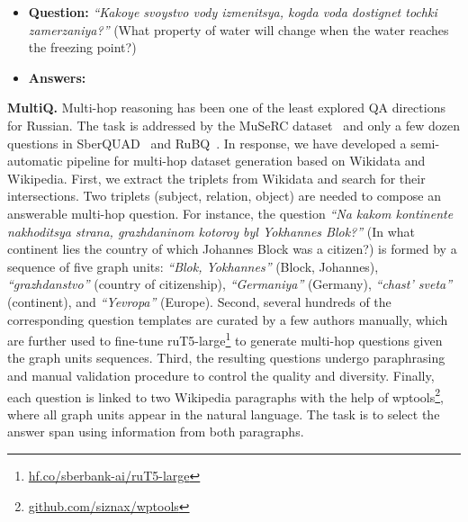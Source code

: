 \documentclass[11pt]{article}
\begin{document}
\begin{itemize}[noitemsep,leftmargin=1.em]
\item \textbf{Question:} \textit{``Kakoye svoystvo vody izmenitsya, kogda voda dostignet tochki zamerzaniya?''} (What property of water will change when the water reaches the freezing point?)
\item  \textbf{Answers:}
\end{itemize} 
\noindent\textbf{MultiQ.}
\label{multiq} Multi-hop reasoning has been one of the least explored QA directions for Russian. The task is addressed by the MuSeRC dataset~\cite{fenogenova-etal-2020-read} and only a few dozen questions in SberQUAD~\cite{Efimov_2020} and RuBQ~\cite{rybin2021rubq}. In response, we have developed a semi-automatic pipeline for multi-hop dataset generation based on Wikidata and Wikipedia.
First, we extract the triplets from Wikidata and search for their intersections. Two triplets (subject, relation, object) are needed to compose an answerable multi-hop question. For instance, the question \textit{``Na kakom kontinente nakhoditsya strana, grazhdaninom kotoroy byl Yokhannes Blok?''}
(In what continent lies the country of which Johannes Block was a citizen?) is formed by a sequence of five graph units: \textit{``Blok, Yokhannes''} (Block, Johannes), \textit{``grazhdanstvo''} (country of citizenship), \textit{``Germaniya''} (Germany), \textit{``chast' sveta''} (continent), and \textit{``Yevropa''} (Europe). Second, several hundreds of the corresponding question templates are curated by a few authors manually, which are further used to fine-tune ruT5-large\footnote{\href{https://huggingface.co/sberbank-ai/ruT5-large/tree/main}{hf.co/sberbank-ai/ruT5-large}} to generate multi-hop questions given the graph units sequences. Third, the resulting questions undergo paraphrasing~\cite{fenogenova-2021-russian} and manual validation procedure to control the quality and diversity. Finally, each question is linked to two Wikipedia paragraphs with the help of wptools\footnote{\href{https://github.com/siznax/wptools/}{github.com/siznax/wptools}}, where all graph units appear in the natural language. The task is to select the answer span using information from both paragraphs.
\end{document}
